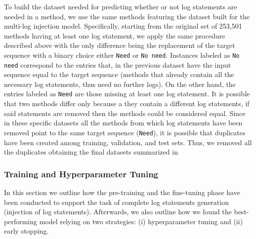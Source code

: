 To build the dataset needed for predicting whether or not log statements are needed in a \java method, we use the same methods featuring the dataset built for the multi-log injection model. Specifically, starting from the original set of 253,501 \java methods having at least one log statement, we apply the same procedure described above with the only difference being the replacement of the target sequence with a binary choice either  \texttt{Need} or \texttt{No need}. Instances labeled as \texttt{No need} correspond to the entries that, in the previous dataset have the input sequence equal to the target sequence (\ie methods that already contain all the necessary log statements, thus need no further logs). On the other hand, the entries labeled as \texttt{Need} are those missing at least one log statement. It is possible that two methods differ only because a they contain a different log statements, if said statements are removed then the methods could be considered equal. Since in these specific datasets all the methods from which log statements have been removed point to the same target sequence (\ie \texttt{Need}), it is possible that duplicates have been created among training, validation, and test sets. Thus, we removed all the duplicates obtaining the final datasets summarized in 



\subsubsection{Training and Hyperparameter Tuning} \label{sec:training}
In this section we outline how the pre-training and the fine-tuning phase have been conducted to support the task of complete log statements generation (\ie injection of log statements). Afterwards, we also outline how we found the best-performing model relying on two strategies: (i) hyperparameter tuning  and (ii) early stopping.

